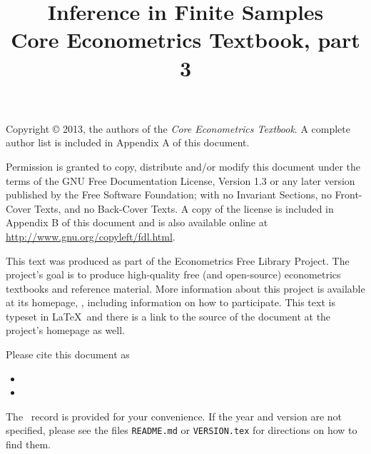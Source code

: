 \documentclass[nohyper]{external/tufte-handout}
\title[Inference in finite samples]%
{Inference in Finite Samples \\
  Core Econometrics Textbook, part 3}
\begin{document}
\maketitle

\bigskip\noindent%
Copyright © 2013, the authors of the \textit{Core Econometrics Textbook}.
A complete author list is included in Appendix A of this document.

Permission is granted to copy, distribute and/or modify this document
under the terms of the GNU Free Documentation License, Version 1.3 or
any later version published by the Free Software Foundation; with no
Invariant Sections, no Front-Cover Texts, and no Back-Cover Texts.  A
copy of the license is included in Appendix B of this document and is
also available online at \url{http://www.gnu.org/copyleft/fdl.html}.

This text was produced as part of the Econometrics Free Library
Project.  The project's goal is to produce high-quality free (and
open-source) econometrics textbooks and reference material.  More
information about this project is available at its homepage,
\homepage, including information on how
to participate.  This text is typeset in \LaTeX\ and there is a link
to the source of the document at the project's homepage as well.

Please cite this document as
\begin{itemize}
\item[] 
\item[] 
\end{itemize}
The \BibTeX\ record is provided for your convenience.
If the year and version are not specified, please see the files
\texttt{README.md} or \texttt{VERSION.tex} for directions on how to
find them.

\tableofcontents








\end{document}
